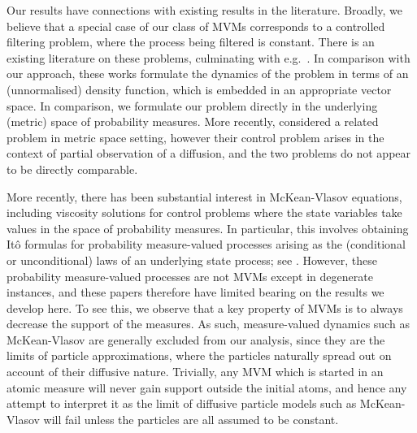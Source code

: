\documentclass{article}
\theoremstyle{definition}
\numberwithin{equation}{section}
\numberwithin{theorem}{section}
\begin{document}
Our results have connections with existing results
in the literature. Broadly, we believe that a special case of our class of MVMs corresponds to a controlled filtering problem, where the process being filtered is constant. There is an
existing literature on these problems, culminating with e.g.~\cite{fabbri_stochastic_2017,gozzi_hamiltonjacobibellman_2000, nisio_book_2015}. In
comparison with our approach, these works formulate the dynamics of
the problem in terms of an (unnormalised) density function, which is
embedded in an appropriate vector space. In comparison, we formulate
our problem directly in the underlying (metric) space of probability
measures. More recently, \citep{bandini_randomized_2019} considered a
related problem in metric space setting, however their control problem
arises in the context of partial observation of a diffusion, and the
two problems do not appear to be directly comparable.

More recently, there has been substantial interest in McKean-Vlasov
equations, including viscosity solutions for
control problems where the state variables take values in the space of
probability measures. In particular, this involves obtaining It\^o formulas for probability measure-valued processes arising as the (conditional or unconditional) laws of an underlying state process; see \cite{cha_cri_del_14,MR3630288,pham_bellman_2018,car_del_18_I,carmona_probabilistic_2018,burzoni_viscosity_2020,guo_pha_wei_20,tal_tou_zha_21,cosso_optimal_2020,wu_viscosity_2020}. However, these probability measure-valued processes are not MVMs except in degenerate instances, and these papers therefore have limited bearing on the results we develop here.
To see this, we observe that a key property of MVMs is to always decrease the support of the measures. As such, measure-valued dynamics such as McKean-Vlasov are generally excluded from our analysis, since they are the limits of particle approximations, where the particles naturally spread out on account of their diffusive nature. Trivially, any MVM which is started in an atomic measure will never gain support outside the initial atoms, and hence any attempt to interpret it as the limit of diffusive particle models such as McKean-Vlasov will fail unless the particles are all assumed to be constant.

\end{document}

